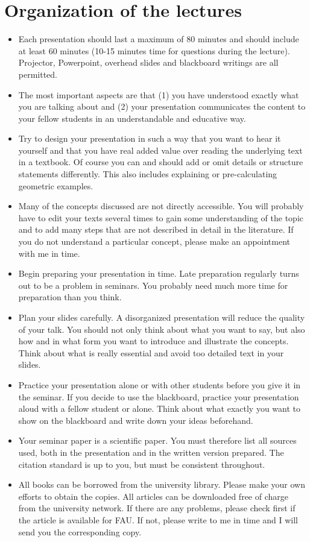 \documentclass{article}
\begin{document}
\section{Organization of the lectures}
\begin{itemize}
    \item Each presentation should last a maximum of 80 minutes and should include at least 60 minutes (10-15 minutes time for questions during the lecture). Projector, Powerpoint, overhead slides and blackboard writings are all permitted.
    \item The most important aspects are that (1) you have understood exactly what you are talking about and (2) your presentation communicates the content to your fellow students in an understandable and educative way.
    \item Try to design your presentation in such a way that you want to hear it yourself and that you have real added value over reading the underlying text in a textbook. Of course you can and should add or omit details or structure statements differently. This also includes explaining or pre-calculating geometric examples.
    \item Many of the concepts discussed are not directly accessible. You will probably have to edit your texts several times to gain some understanding of the topic and to add many steps that are not described in detail in the literature. If you do not understand a particular concept, please make an appointment with me in time.
    \item Begin preparing your presentation in time. Late preparation regularly turns out to be a problem in seminars. You probably need much more time for preparation than you think.
    \item Plan your slides carefully. A disorganized presentation will reduce the quality of your talk. You should not only think about what you want to say, but also how and in what form you want to introduce and illustrate the concepts. Think about what is really essential and avoid too detailed text in your slides. 
    \item Practice your presentation alone or with other students before you give it in the seminar. If you decide to use the blackboard, practice your presentation aloud with a fellow student or alone. Think about what exactly you want to show on the blackboard and write down your ideas beforehand.
    \item Your seminar paper is a scientific paper. You must therefore list all sources used, both in the presentation and in the written version prepared. The citation standard is up to you, but must be consistent throughout.
    \item All books can be borrowed from the university library. Please make your own efforts to obtain the copies. All articles can be downloaded free of charge from the university network. If there are any problems, please check first if the article is available for FAU. If not, please write to me in time and I will send you the corresponding copy.
\end{itemize}
\end{document}
